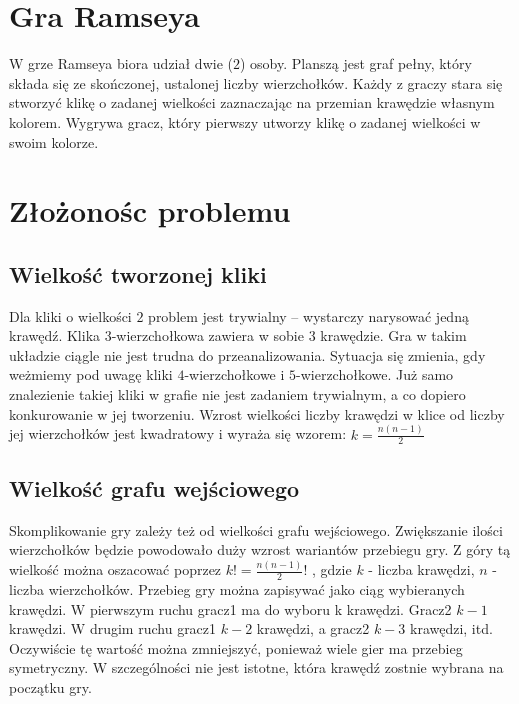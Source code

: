 \documentclass[11pt,a4paper]{article}
\theoremstyle{definition}
\theoremstyle{remark}
\begin{document}
\section{Gra Ramseya}
W grze Ramseya biora udział dwie ($2$) osoby.
Planszą jest graf pełny, który składa się ze skończonej, ustalonej liczby wierzchołków.
Każdy z graczy stara się stworzyć klikę o zadanej wielkości zaznaczając
na przemian krawędzie własnym kolorem. Wygrywa gracz,
który pierwszy utworzy klikę o zadanej wielkości w swoim kolorze.

\section{Złożonośc problemu}

\subsection{Wielkość tworzonej kliki}
Dla kliki o wielkości $2$ problem jest trywialny -- wystarczy narysować jedną krawędź.
Klika 3-wierzchołkowa zawiera w sobie $3$ krawędzie.
 Gra w takim układzie ciągle nie jest trudna do przeanalizowania.
Sytuacja się zmienia, gdy weżmiemy pod uwagę kliki $4$-wierzchołkowe i $5$-wierzchołkowe.
Już samo znalezienie takiej kliki w grafie nie jest zadaniem trywialnym,
a co dopiero konkurowanie w jej tworzeniu.
Wzrost wielkości liczby krawędzi w klice od liczby jej wierzchołków jest kwadratowy i
wyraża się wzorem: $k = \frac{n(n - 1)}{2}$

\subsection{Wielkość grafu wejściowego}
Skomplikowanie gry zależy też od wielkości grafu wejściowego.
Zwiększanie ilości wierzchołków będzie powodowało duży wzrost wariantów przebiegu gry.
Z góry tą wielkość można oszacować poprzez $k! = \frac{n(n - 1)}{2}!$
, gdzie $k$ - liczba krawędzi, $n$ - liczba wierzchołków.
Przebieg gry można zapisywać jako ciąg wybieranych krawędzi.
W pierwszym ruchu gracz1 ma do wyboru k krawędzi. Gracz2 $k-1$ krawędzi.
W drugim ruchu gracz1 $k-2$ krawędzi, a gracz2 $k-3$ krawędzi, itd.
Oczywiście tę wartość można zmniejszyć, ponieważ wiele gier ma przebieg symetryczny.
W szczególności nie jest istotne, która krawędź zostnie wybrana na początku gry.
\end{document}
